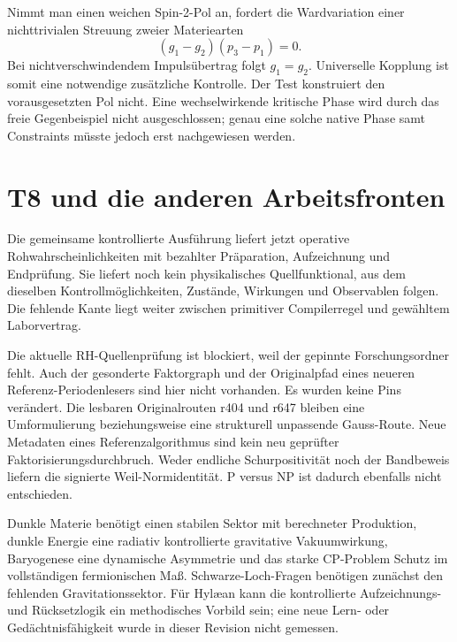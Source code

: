 Nimmt man einen weichen Spin-2-Pol an, fordert die Wardvariation einer nichttrivialen Streuung zweier Materiearten
\begin{equation}
(g_1-g_2)(p_3-p_1)=0.
\end{equation}
Bei nichtverschwindendem Impulsübertrag folgt $g_1=g_2$. Universelle Kopplung ist somit eine notwendige zusätzliche Kontrolle. Der Test konstruiert den vorausgesetzten Pol nicht. Eine wechselwirkende kritische Phase wird durch das freie Gegenbeispiel nicht ausgeschlossen; genau eine solche native Phase samt Constraints müsste jedoch erst nachgewiesen werden.

\section{T8 und die anderen Arbeitsfronten}
Die gemeinsame kontrollierte Ausführung liefert jetzt operative Rohwahrscheinlichkeiten mit bezahlter Präparation, Aufzeichnung und Endprüfung. Sie liefert noch kein physikalisches Quellfunktional, aus dem dieselben Kontrollmöglichkeiten, Zustände, Wirkungen und Observablen folgen. Die fehlende Kante liegt weiter zwischen primitiver Compilerregel und gewähltem Laborvertrag.

Die aktuelle RH-Quellenprüfung ist blockiert, weil der gepinnte Forschungsordner fehlt. Auch der gesonderte Faktorgraph und der Originalpfad eines neueren Referenz-Periodenlesers sind hier nicht vorhanden. Es wurden keine Pins verändert. Die lesbaren Originalrouten r404 und r647 bleiben eine Umformulierung beziehungsweise eine strukturell unpassende Gauss-Route. Neue Metadaten eines Referenzalgorithmus sind kein neu geprüfter Faktorisierungsdurchbruch. Weder endliche Schurpositivität noch der Bandbeweis liefern die signierte Weil-Normidentität. P versus NP ist dadurch ebenfalls nicht entschieden.

Dunkle Materie benötigt einen stabilen Sektor mit berechneter Produktion, dunkle Energie eine radiativ kontrollierte gravitative Vakuumwirkung, Baryogenese eine dynamische Asymmetrie und das starke CP-Problem Schutz im vollständigen fermionischen Maß. Schwarze-Loch-Fragen benötigen zunächst den fehlenden Gravitationssektor. Für Hylæan kann die kontrollierte Aufzeichnungs- und Rücksetzlogik ein methodisches Vorbild sein; eine neue Lern- oder Gedächtnisfähigkeit wurde in dieser Revision nicht gemessen.

